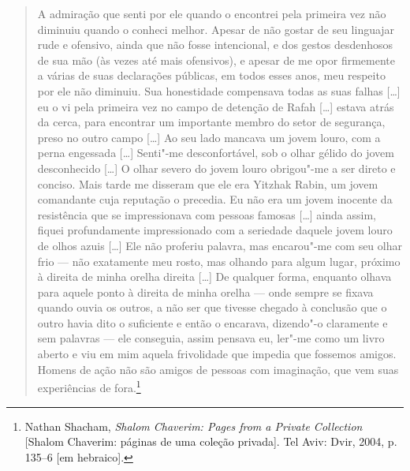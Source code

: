 
\begin{quote}
A admiração que senti por ele quando o encontrei pela primeira vez não
diminuiu quando o conheci melhor. Apesar de não gostar de seu linguajar
rude e ofensivo, ainda que não fosse intencional, e dos gestos desdenhosos de
sua mão (às vezes até mais ofensivos), e apesar de me opor firmemente a
várias de suas declarações públicas, em todos esses anos, meu respeito
por ele não diminuiu. Sua honestidade compensava todas as suas falhas {[}\ldots{}{]}
eu o vi pela primeira vez no campo de detenção de Rafah {[}\ldots{}{]} estava atrás
da cerca, para encontrar um importante membro do setor de segurança,
preso no outro campo {[}\ldots{}{]} Ao seu lado mancava um jovem louro, com a perna
engessada {[}\ldots{}{]} Senti"-me desconfortável, sob o olhar gélido do jovem
desconhecido {[}\ldots{}{]} O olhar severo do jovem louro obrigou"-me a ser direto e
conciso. Mais tarde me disseram que ele era Yitzhak Rabin, um jovem
comandante cuja reputação o precedia. Eu não era um jovem inocente da
resistência que se impressionava com pessoas famosas {[}\ldots{}{]} ainda assim,
fiquei profundamente impressionado com a seriedade daquele jovem louro
de olhos azuis {[}\ldots{}{]} Ele não proferiu palavra, mas encarou"-me com seu olhar
frio --- não exatamente meu rosto, mas olhando para algum lugar, próximo
à direita de minha orelha direita {[}\ldots{}{]} De qualquer forma, enquanto olhava
para aquele ponto à direita de minha orelha --- onde sempre se fixava
quando ouvia os outros, a não ser que tivesse chegado à conclusão que o
outro havia dito o suficiente e então o encarava, dizendo"-o claramente e
sem palavras --- ele conseguia, assim pensava eu, ler"-me como um livro
aberto e viu em mim aquela frivolidade que impedia que fossemos amigos.
Homens de ação não são amigos de pessoas com imaginação, que vem suas
experiências de fora.\footnote{Nathan Shacham, \textit{Shalom Chaverim: Pages from a Private Collection} {[Shalom Chaverim: páginas de uma coleção privada]}. Tel Aviv: Dvir, 2004, p. 135--6 {[}em hebraico{]}.}
\end{quote}

